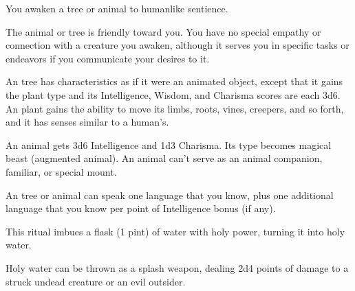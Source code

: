\begin{spelleffect}
You awaken a tree or animal to humanlike sentience.
\par The  animal or tree is friendly toward you. You have no special empathy or connection with a creature you awaken, although it serves you in specific tasks or endeavors if you communicate your desires to it.
\par An  tree has characteristics as if it were an animated object, except that it gains the plant type and its Intelligence, Wisdom, and Charisma scores are each 3d6. An  plant gains the ability to move its limbs, roots, vines, creepers, and so forth, and it has senses similar to a human's.
\par An  animal gets 3d6 Intelligence and \plus1d3 Charisma. Its type becomes magical beast (augmented animal). An  animal can't serve as an animal companion, familiar, or special mount.
\par An  tree or animal can speak one language that you know, plus one additional language that you know per point of Intelligence bonus (if any).
\end{spelleffect}

\begin{spelleffect}
This ritual imbues a flask (1 pint) of water with holy power, turning it into holy water.
\end{spelleffect}
\begin{spellnotes}
Holy water can be thrown as a splash weapon, dealing 2d4 points of damage to a struck undead creature or an evil outsider.
\end{spellnotes}

